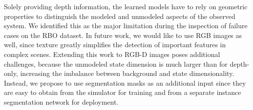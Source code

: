 \documentclass[letterpaper, 10 pt, journal, twoside]{ieeetran}  %
\begin{document}
Solely providing depth information, the learned models have to rely on geometric properties to distinguish the modeled and unmodeled aspects of the observed system. We identified this as the major limitation during the inspection of failure cases on the RBO dataset.
In future work, we would like to use RGB images as well, since texture greatly simplifies the detection of important features in complex scenes.
Extending this work to RGB-D images poses additional challenges, because the unmodeled state dimension is much larger than for depth-only, increasing the imbalance between background and state dimensionality.
Instead, we propose to use segmentation masks as an additional input since they are easy to obtain from the simulator for training and from a separate instance segmentation network for deployment. 



\end{document}
